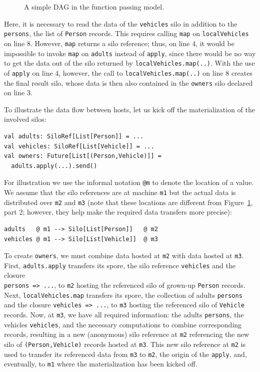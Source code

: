 \documentclass{jfp1}
\begin{document}
\begin{figure}[ht!]
\caption{A simple DAG in the function passing model.}\label{fig:bigger-dag}
\end{figure}

\noindent
Here, it is necessary to read the data of the \verb|vehicles| silo in
addition to the \verb|persons|, the list of \verb|Person|
records. This requires calling \verb|map| on \verb|localVehicles| on
line 8.  However, \verb|map| returns a silo reference; thus, on line
4, it would be impossible to invoke \verb|map| on \verb|adults|
instead of \verb|apply|, since there would be no way to get the data
out of the silo returned by \verb|localVehicles.map(..)|. With the use
of \verb|apply| on line 4, however, the call to
\verb|localVehicles.map(..)| on line 8 creates the final result silo,
whose data is then also contained in the \verb|owners| silo declared
on line 3.

To illustrate the data flow between hosts, let us kick off the
materialization of the involved silos:
\begin{lstlisting}
val adults: SiloRef[List[Person]] = ...
val vehicles: SiloRef[List[Vehicle]] = ...
val owners: Future[List[(Person,Vehicle)]] =
  adults.apply(...).send()
\end{lstlisting}
\noindent
For illustration we use the informal notation \verb|@m| to denote the
location of a value. We assume that the silo references are at machine
\verb|m1| but the actual data is distributed over \verb|m2| and
\verb|m3| (note that these locations are different from
Figure~\ref{fig:bigger-dag}, part 2; however, they help make the
required data transfers more precise):

\begin{lstlisting}
adults   @ m1 --> Silo[List[Person]]   @ m2
vehicles @ m1 --> Silo[List[Vehicle]]  @ m3
\end{lstlisting}
\noindent
To create \verb|owners|, we must combine data hosted at \verb|m2| with
data hosted at \verb|m3|. First, \verb|adults.apply| transfers its
spore, \ie the silo reference \verb|vehicles| and the closure\\
\verb|persons => ...|, to \verb|m2| hosting the referenced silo of
grown-up \verb|Person| records. Next, \verb|localVehicles.map|
transfers its spore, \ie the collection of adults \verb|persons| and
the closure \verb|vehicles => ...|, to \verb|m3| hosting the
referenced silo of \verb|Vehicle| records. Now, at \verb|m3|, we have
all required information: the adults \verb|persons|, the vehicles
\verb|vehicles|, and the necessary computations to combine
corresponding records, resulting in a new (anonymous) silo reference
at \verb|m2| referencing the new silo of \verb|(Person,Vehicle)|
records hosted at \verb|m3|. This new silo reference at \verb|m2| is
used to transfer its referenced data from \verb|m3| to \verb|m2|, the
origin of the \verb|apply|, and, eventually, to \verb|m1| where the
materialization has been kicked off.
\end{document}
